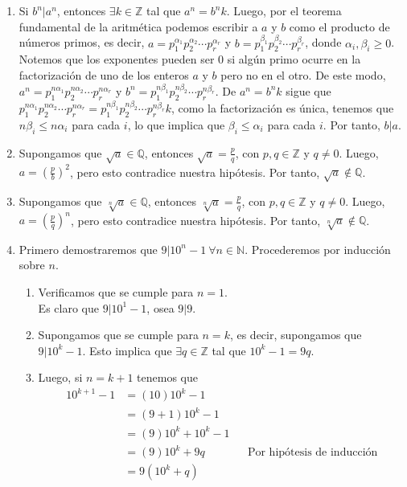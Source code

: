 \documentclass[11pt]{article}
\newcommand{\N}{\mathbb{N}}
\newcommand{\Z}{\mathbb{Z}}
\newcommand{\Q}{\mathbb{Q}}
\begin{document}
\begin{enumerate}[start=10]
  \item Si $b^n|a^n$, entonces $\exists k\in\Z$ tal que $a^n=b^nk$. Luego, por el teorema fundamental de la aritmética podemos escribir a $a$ y $b$ como el producto de números primos, es decir, $a=p_1^{\alpha_1} p_2^{\alpha_2} \cdots p_r^{\alpha_r}$ y $b=p_1^{\beta_1} p_2^{\beta_2} \cdots p_r^{\beta_r}$, donde $\alpha_i, \beta_i \geq 0$. Notemos que los exponentes pueden ser $0$ si algún primo ocurre en la factorización de uno de los enteros $a$ y $b$ pero no en el otro. De este modo, $a^n=p_1^{n \alpha_1} p_2^{n \alpha_2} \cdots p_r^{n \alpha_r}$ y $b^n=p_1^{n \beta_1} p_2^{n \beta_2} \cdots p_r^{n \beta_r}$. De $a^n=b^nk$ sigue que $p_1^{n \alpha_1} p_2^{n \alpha_2} \cdots p_r^{n \alpha_r}=p_1^{n \beta_1} p_2^{n \beta_2} \cdots p_r^{n \beta_r}k$, como la factorización es única, tenemos que $n\beta_i \leq n\alpha_i$ para cada $i$, lo que implica que $\beta_i \leq \alpha_i$ para cada $i$. Por tanto, $b|a$.
  \item Supongamos que $\sqrt{a}\in \Q$, entonces $\sqrt{a}=\frac{p}{q}$, con $p,q\in\Z$ y $q\neq 0$. Luego, $a=(\frac{p}{b})^2$, pero esto contradice nuestra hipótesis. Por tanto, $\sqrt{a}\notin \Q$.
  \item Supongamos que $\sqrt[n]{a}\in \Q$, entonces $\sqrt[n]{a}=\frac{p}{q}$, con $p,q\in\Z$ y $q\neq 0$. Luego, $a=(\frac{p}{q})^n$, pero esto contradice nuestra hipótesis. Por tanto, $\sqrt[n]{a}\notin \Q$.
  \item Primero demostraremos que $9|10^n-1 \ \forall n\in \N$. Procederemos por inducción sobre $n$.
    \begin{enumerate}[label=\roman*)]
      \item Verificamos que se cumple para $n=1$. \\ Es claro que $9|10^1-1$, osea  $9|9$.
      \item Supongamos que se cumple para $n=k$, es decir, supongamos que $9|10^k-1$. Esto implica que $\exists q \in \Z$ tal que $10^k-1=9q$.
      \item Luego, si $n=k+1$ tenemos que
        \begin{align*}
          10^{k+1}-1 &= (10)10^k-1\\
          &= (9+1)10^k-1\\
          &= (9)10^k+10^k-1\\
          &= (9)10^k+9q && \text{Por hipótesis de inducción}\\
          &=9(10^k+q)\\
        \end{align*}

\end{enumerate}
\end{enumerate}
\end{document}
